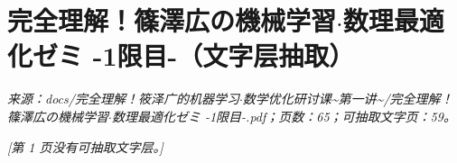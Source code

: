 \chapter*{完全理解！篠澤広の機械学習$\cdot$数理最適化ゼミ -1限目-（文字层抽取）}
\begingroup\small
\noindent\textit{来源：docs/完全理解！筱泽广的机器学习$\cdot$数学优化研讨课\textasciitilde{}第一讲\textasciitilde{}/完全理解！篠澤広の機械学習$\cdot$数理最適化ゼミ -1限目-.pdf；页数：65；可抽取文字页：59。}\par
\endgroup
\medskip
\begingroup
\setlength{\parindent}{0pt}
\setlength{\parskip}{0.45em}

\noindent\textit{[第 1 页没有可抽取文字层。]}\par

